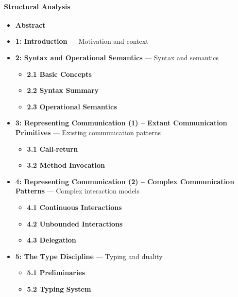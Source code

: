 \documentclass{article}
\begin{document}
\paragraph{Structural Analysis}
\begin{itemize}
    \item \textbf{Abstract}

    \item \textbf{1: Introduction} --- Motivation and context

    \item \textbf{2: Syntax and Operational Semantics} --- Syntax and semantics
    \begin{itemize}
        \item \textbf{2.1 Basic Concepts}

        \item \textbf{2.2 Syntax Summary}

        \item \textbf{2.3 Operational Semantics}
    \end{itemize}

    \item \textbf{3: Representing Communication (1) -- Extant Communication Primitives} --- Existing communication patterns
    \begin{itemize}
        \item \textbf{3.1 Call-return}

        \item \textbf{3.2 Method Invocation}
    \end{itemize}

    \item \textbf{4: Representing Communication (2) -- Complex Communication Patterns} --- Complex interaction models
    \begin{itemize}
        \item \textbf{4.1 Continuous Interactions}

        \item \textbf{4.2 Unbounded Interactions}

        \item \textbf{4.3 Delegation}
    \end{itemize}

    \item \textbf{5: The Type Discipline} --- Typing and duality
    \begin{itemize}
        \item \textbf{5.1 Preliminaries}

        \item \textbf{5.2 Typing System}


\end{itemize}
\end{itemize}
\end{document}
